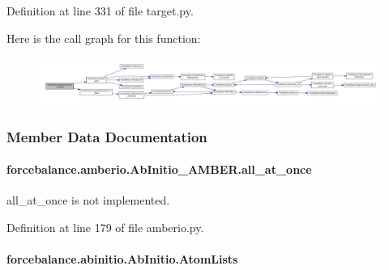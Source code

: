 Definition at line 331 of file target.\-py.



Here is the call graph for this function\-:\nopagebreak
\begin{figure}[H]
\begin{center}
\leavevmode
\includegraphics[width=350pt]{classforcebalance_1_1target_1_1Target_af6099ec09486213869dba2491bd8ea04_cgraph}
\end{center}
\end{figure}




\subsubsection{Member Data Documentation}
\hypertarget{classforcebalance_1_1amberio_1_1AbInitio__AMBER_a39462b1942be0f7fb6202862ad1afa9c}{
\paragraph[{all\-\_\-at\-\_\-once}]{\setlength{\rightskip}{0pt plus 5cm}forcebalance.\-amberio.\-Ab\-Initio\-\_\-\-A\-M\-B\-E\-R.\-all\-\_\-at\-\_\-once}}\label{classforcebalance_1_1amberio_1_1AbInitio__AMBER_a39462b1942be0f7fb6202862ad1afa9c}


all\-\_\-at\-\_\-once is not implemented. 



Definition at line 179 of file amberio.\-py.

\hypertarget{classforcebalance_1_1abinitio_1_1AbInitio_a7e62a74e820ac0c5dd67f49155b95c41}{
\paragraph[{Atom\-Lists}]{\setlength{\rightskip}{0pt plus 5cm}forcebalance.\-abinitio.\-Ab\-Initio.\-Atom\-Lists\hspace{0.3cm}{\ttfamily [inherited]}}}\label{classforcebalance_1_1abinitio_1_1AbInitio_a7e62a74e820ac0c5dd67f49155b95c41}


